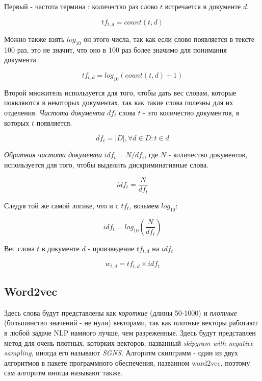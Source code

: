 \documentclass[a4paper,12pt,preview]{report} %
\begin{document}
	Первый - частота термина \cite{12}: количество раз слово $t$ встречается в документе $d$.
	
	\begin{equation}
	tf_{t,d} = count(t, d)
	\end{equation}
	
	Можно также взять $log_{10}$ он этого числа, так как если слово появляется в тексте 100 раз, это не значит, что оно в 100 раз более значимо для понимания документа.
	
	\begin{equation}
	tf_{t,d} = log_{10}(count(t, d) + 1)
	\end{equation}
	
	Второй множитель используется для того, чтобы дать вес словам, которые появляются в некоторых документах, так как такие слова полезны для их отделения. \textit{Частота документа} $df_t$ слова $t$ - это количество документов, в которых $t$ появляется. 
	
	\begin{equation}
	df_t = |D|, \forall d \in D: t \in d
	\end{equation}
	
	\textit{Обратная частота документа} $idf_t = N / df_i$, где $N$ - количество документов, используется для того, чтобы выделить дискриминативные слова.  
	
	\begin{equation}
	idf_t = \dfrac{N}{df_t}
	\end{equation}
	
	Следуя той же самой логике, что и с $tf_t$, возьмем $log_{10}$:
	
	\begin{equation}
	idf_t = log_{10} (\dfrac{N}{df_t})
	\end{equation}
	
	Вес слова $t$ в документе $d$ - произведение $tf_{t, d}$ на $idf_t$
	
	\begin{equation}
	w_{t, d} = tf_{t, d} \times idf_t
	\end{equation}
	
	\subsection{Word2vec}
	
	Здесь слова будут представлены как \textit{короткие} (длины 50-1000) и \textit{плотные} (большинство значений - не нули) векторами, так как плотные векторы работают в любой задаче NLP намного лучше, чем разреженные. Здесь будут представлен метод для очень плотных, которких векторов, названный \textit{skipgram with negative sampling}, иногда его называют \textit{SGNS}. Алгоритм скипграмм - один из двух алгоритмов в пакете программного обеспечения, названном word2vec, поэтому сам алгоритм иногда называют также.
	
\end{document}
